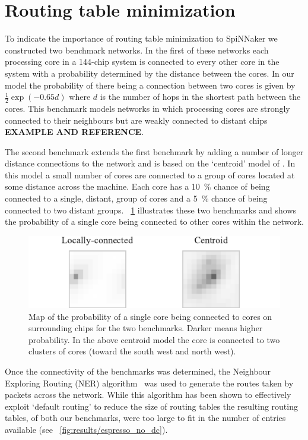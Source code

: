 \documentclass[conference]{IEEEtran}
\begin{document}
\section{Routing table minimization}

To indicate the importance of routing table minimization to SpiNNaker we constructed two benchmark networks.
In the first of these networks each processing core in a 144-chip system is connected to every other core in the system with a probability determined by the distance between the cores.
In our model the probability of there being a connection between two cores is given by $\frac{1}{2}\exp(-0.65d)$ where $d$ is the number of hops in the shortest path between the cores.
This benchmark models networks in which processing cores are strongly connected to their neighbours but are weakly connected to distant chips \textbf{EXAMPLE AND REFERENCE}.

The second benchmark extends the first benchmark by adding a number of longer distance connections to the network and is based on the `centroid' model of \textcite{Navaridas2015}.
In this model a small number of cores are connected to a group of cores located at some distance across the machine.
Each core has a \SI{10}{\percent} chance of being connected to a single, distant, group of cores and a \SI{5}{\percent} chance of being connected to two distant groups.
\figurename~\ref{fig:experiment/setup} illustrates these two benchmarks and shows the probability of a single core being connected to other cores within the network.

\begin{figure}
  \centering
  \includegraphics{experiments/experiments.pdf}
  \caption{Map of the probability of a single core being connected to cores on surrounding chips for the two benchmarks. Darker means higher probability.
           In the above centroid model the core is connected to two clusters of cores (toward the south west and north west).}
  \label{fig:experiment/setup}
\end{figure}

Once the connectivity of the benchmarks was determined, the Neighbour Exploring Routing (NER) algorithm~\parencite{Navaridas2015} was used to generate the routes taken by packets across the network.
While this algorithm has been shown to effectively exploit `default routing' to reduce the size of routing tables the resulting routing tables, of both our benchmarks, were too large to fit in the number of entries available (see \figurename~\ref{fig:results/espresso_no_dc}).
\end{document}
